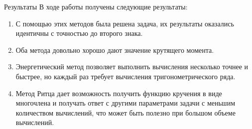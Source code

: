 \documentclass[ignoreonframetext,unicode]{beamer}
\begin{document}
\begin{frame}{Результаты}
	В ходе работы получены следующие результаты:
	\begin{block}{}
	\begin{enumerate}
		\item С помощью этих методов была решена задача, их результаты оказались идентичны с точностью до второго знака.	
		\item Оба метода довольно хорошо дают значение крутящего момента.
		\item Энергетический метод позволяет выполнить вычисления несколько точнее и быстрее, но каждый раз требует вычисления тригонометрического ряда.
		\item 
		Метод Ритца дает возможность получить функцию кручения в виде многочлена и получать ответ с другими параметрами задачи с меньшим количеством вычислений, что может быть полезно при большом объеме вычислений.
	\end{enumerate}
	\end{block}	
\end{frame}	
\end{document}
